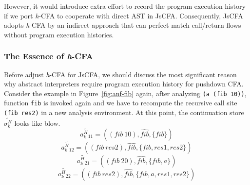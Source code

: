\documentclass{article}
\begin{document}
However, it would introduce extra effort to record the program execution history if we port \textit{h}-CFA to cooperate with direct AST in JsCFA\@. Consequently, JsCFA adopts \textit{h}-CFA by an indirect approach that can perfect match call/return flows without program execution histories.

\subsubsection{The Essence of \textit{h}-CFA}
\label{subs:ehcfa}
Before adjust \textit{h}-CFA for JsCFA, we should discuss the most significant reason why abstract interpreters require program execution history for pushdown CFA\@. Consider the example in Figure~\ref{fig:anf-fib} again, after analyzing \verb|(a (fib 10))|, function \verb|fib| is invoked again and we have to recompute the recursive call site \verb|(fib res2)| in a new analysis environment. At this point, the continuation store $\widetilde{\sigma_k^H}$ looks like blow.
\[
\widetilde{a^H_k{}_{11}} = ((fib\ 10), \widehat{fib}, \{fib\})
\]
\[
\widetilde{a^H_k{}_{12}} = ((fib\ res2), \widehat{fib}, \{fib, res1, res2\})
\]
\[
\widetilde{a^H_k{}_{21}} = ((fib\ 20), \widehat{fib}, \{fib, a\})
\]
\[
\widetilde{a^H_k{}_{22}} = ((fib\ res2), \widehat{fib}, \{fib, a, res1, res2\})
\]
\end{document}
